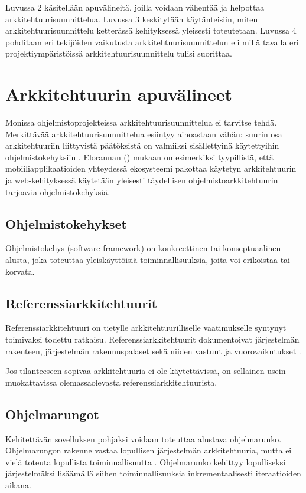Luvussa 2 käsitellään apuvälineitä, joilla voidaan vähentää ja helpottaa arkkitehtuurisuunnittelua. Luvussa 3 keskitytään käytänteisiin, miten arkkitehtuurisuunnittelu ketterässä kehityksessä yleisesti toteutetaan. Luvussa 4 pohditaan eri tekijöiden vaikutusta arkkitehtuurisuunnittelun eli millä tavalla eri projektiympäristöissä arkkitehtuurisuunnittelu tulisi suorittaa.

\chapter{Arkkitehtuurin apuvälineet}
Monissa ohjelmistoprojekteissa arkkitehtuurisuunnittelua ei tarvitse tehdä.
Merkittävää arkkitehtuurisuunnittelua esiintyy ainoastaan vähän: suurin osa arkkitehtuuriin liittyvistä päätöksistä on valmiiksi sisällettyinä käytettyihin ohjelmistokehyksiin \citep{bellomo2014agilely}. Elorannan (\citeyear{eloranta2015techniques}) mukaan on esimerkiksi tyypillistä, että mobiiliapplikaatioiden yhteydessä ekosysteemi pakottaa käytetyn arkkitehtuurin ja web-kehityksessä käytetään yleisesti täydellisen ohjelmistoarkkitehtuurin tarjoavia ohjelmistokehyksiä.


\section{Ohjelmistokehykset}
Ohjelmistokehys (software framework) on konkreettinen tai konseptuaalinen alusta, joka toteuttaa yleiskäyttöisiä toiminnallisuuksia, joita voi erikoistaa tai korvata.


\section{Referenssiarkkitehtuurit}
Referenssiarkkitehtuuri on tietylle arkkitehtuurilliselle vaatimukselle syntynyt toimivaksi todettu ratkaisu. Referenssiarkkitehtuurit dokumentoivat järjestelmän rakenteen, järjestelmän rakennuspalaset sekä niiden vastuut ja vuorovaikutukset \citep{vogel2011software}. 

Jos tilanteeseen sopivaa arkkitehtuuria ei ole käytettävissä, on sellainen usein muokattavissa olemassaolevasta referenssiarkkitehtuurista.

\section{Ohjelmarungot}
Kehitettävän sovelluksen pohjaksi voidaan toteuttaa alustava ohjelmarunko.
Ohjelmarungon rakenne vastaa lopullisen järjestelmän arkkitehtuuria, mutta ei vielä toteuta lopullista toiminnallisuutta \citep{vogel2011software}. Ohjelmarunko kehittyy lopulliseksi järjestelmäksi lisäämällä siihen toiminnallisuuksia inkrementaalisesti iteraatioiden aikana.


